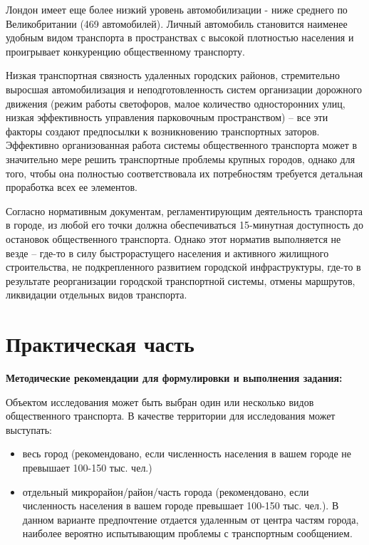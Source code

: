 \documentclass[
  11pt,
]{book}
\begin{document}
Лондон имеет еще более низкий уровень автомобилизации - ниже среднего по Великобритании (469 автомобилей). Личный автомобиль становится наименее удобным видом транспорта в пространствах с высокой плотностью населения и проигрывает конкуренцию общественному транспорту.

Низкая транспортная связность удаленных городских районов, стремительно выросшая автомобилизация и
неподготовленность систем организации дорожного движения (режим работы светофоров, малое количество односторонних улиц, низкая эффективность управления парковочным пространством) -- все эти факторы создают предпосылки к возникновению транспортных заторов. Эффективно организованная работа системы общественного транспорта может в значительно мере решить транспортные проблемы крупных городов, однако для того, чтобы она полностью соответствовала их потребностям требуется детальная проработка всех ее элементов.

Согласно нормативным документам, регламентирующим деятельность транспорта в городе, из любой его
точки должна обеспечиваться 15-минутная доступность до остановок общественного транспорта. Однако этот норматив выполняется не везде -- где-то в силу быстрорастущего населения и активного жилищного строительства, не подкрепленного развитием городской инфраструктуры, где-то в результате реорганизации городской транспортной системы, отмены маршрутов, ликвидации отдельных видов транспорта.

\section{Практическая часть}\label{ux43fux440ux430ux43aux442ux438ux447ux435ux441ux43aux430ux44f-ux447ux430ux441ux442ux44c-3}

\textbf{Методические рекомендации для формулировки и выполнения задания:}

Объектом исследования
может быть выбран один или несколько видов общественного транспорта. В качестве
территории для исследования может выступать:

\begin{itemize}
\item
  весь город (рекомендовано, если численность населения в вашем городе не превышает 100-150 тыс. чел.)
\item
  отдельный микрорайон/район/часть города (рекомендовано, если численность населения в вашем городе превышает 100-150 тыс. чел.). В данном варианте предпочтение отдается удаленным от центра частям города, наиболее вероятно испытывающим проблемы с транспортным сообщением.
\end{itemize}
\end{document}
